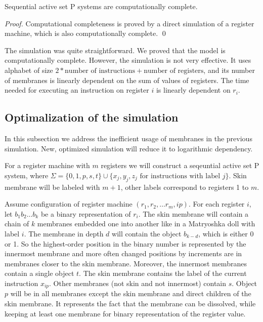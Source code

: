 \documentclass[llncs,submission,copyright,creativecommons]{../lib/lncs/llncs}
\begin{document}
\begin{theorem}
  Sequential active set P systems are computationally complete.
\end{theorem}

\begin{proof}
  Computational completeness is proved by a direct simulation of a register machine, which is also computationally complete. \qed
\end{proof}

The simulation was quite straightforward. We proved that the model is computationally complete. However, the simulation is not very effective. It uses alphabet of size $2 * \text{number of instructions} + \text{number of registers}$, and its number of membranes is linearly dependent on the sum of values of registers. The time needed for executing an instruction on register $i$ is linearly dependent on $r_i$.


\subsection{Optimalization of the simulation} %
\label{sub:optimalization_of_the_simulation}

In this subsection we address the inefficient usage of membranes in the previous simulation. New, optimized simulation will reduce it to logarithmic dependency.

For a register machine with $m$ registers we will construct a seqeuntial active set P system, where $\Sigma = \{0,1,p,s,t\}\cup\{x_j, y_j, z_j \text{~for instructions with label~} j\}$. Skin membrane will be labeled with $m+1$, other labels correspond to registers 1 to $m$.

Assume configuration of register machine $(r_1, r_2, \ldots r_m, ip)$. For each register $i$, let $b_1b_2\ldots b_k$ be a binary representation of $r_i$. The skin membrane will contain a chain of $k$ membranes embedded one into another like in a Matryoshka doll with label $i$.
The membrane in depth $d$ will contain the object $b_{k-d}$, which is either 0 or 1. So the highest-order position in the binary number is represented by the innermost membrane and more often changed positions by increments are in membranes closer to the skin membrane. Moreover, the innermost membranes contain a single object $t$. The skin membrane contains the label of the current instruction $x_{ip}$. Other membranes (not skin and not innermost) contain $s$. Object $p$ will be in all membranes except the skin membrane and direct children of the skin membrane. It represents the fact that the membrane can be dissolved, while keeping at least one membrane for binary representation of the register value.
\end{document}
